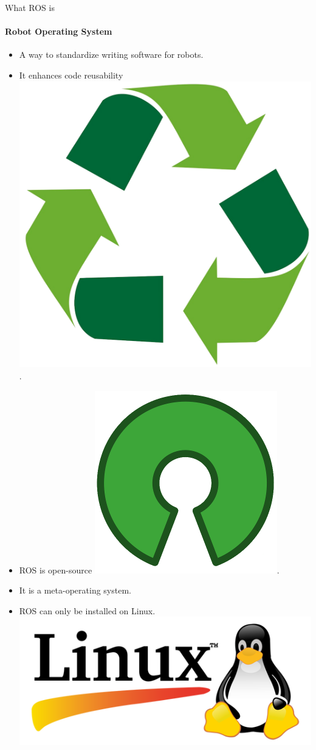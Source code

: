 \documentclass{beamer}
\begin{document}
\begin{frame}{What ROS is}
    \framesubtitle{Robot Operating System}
    \begin{itemize}
        \item A way to standardize writing software for robots.
        \item It enhances {\huge code reusability} \includegraphics[scale=0.02]{figures/recycling.png}.
        \item ROS is open-source \includegraphics[scale=0.09]{figures/open_source.png}.
        \item It is a meta-operating system.
        \item ROS can only be installed on Linux.  \includegraphics[width=.1\linewidth]{figures/linux_logo.png}

    \end{itemize}
\end{frame}
\end{document}
